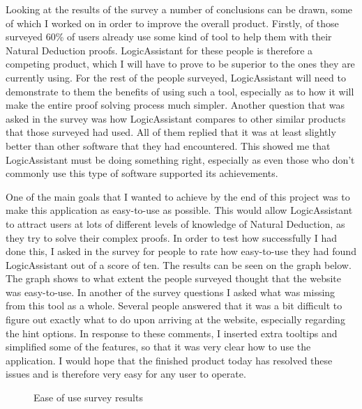 Looking at the results of the survey a number of conclusions can be drawn, some of which I worked on in order to improve the overall product. Firstly, of those surveyed 60\% of users already use some kind of tool to help them with their Natural Deduction proofs. LogicAssistant for these people is therefore a competing product, which I will have to prove to be superior to the ones they are currently using. For the rest of the people surveyed, LogicAssistant will need to demonstrate to them the benefits of using such a tool, especially as to how it will make the entire proof solving process much simpler. Another question that was asked in the survey was how LogicAssistant compares to other similar products that those surveyed had used. All of them replied that it was at least slightly better than other software that they had encountered. This showed me that LogicAssistant must be doing something right, especially as even those who don't commonly use this type of software supported its achievements.

One of the main goals that I wanted to achieve by the end of this project was to make this application as easy-to-use as possible. This would allow LogicAssistant to attract users at lots of different levels of knowledge of Natural Deduction, as they try to solve their complex proofs. In order to test how successfully I had done this, I asked in the survey for people to rate how easy-to-use they had found LogicAssistant out of a score of ten. The results can be seen on the graph below. The graph shows to what extent the people surveyed thought that the website was easy-to-use. In another of the survey questions I asked what was missing from this tool as a whole. Several people answered that it was a bit difficult to figure out exactly what to do upon arriving at the website, especially regarding the hint options. In response to these comments, I inserted extra tooltips and simplified some of the features, so that it was very clear how to use the application. I would hope that the finished product today has resolved these issues and is therefore very easy for any user to operate.

\begin{figure}[!ht]
	\centering
	\caption{Ease of use survey results}
\end{figure}

